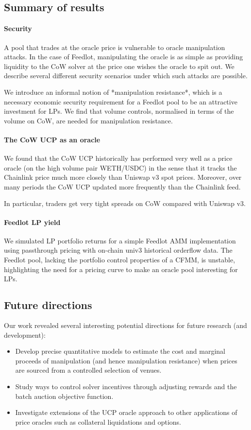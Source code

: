 \documentclass[a4paper,10pt]{article}
\theoremstyle{remark}
\begin{document}
\subsection{Summary of results}

\paragraph{Security}
A pool that trades at the oracle price is vulnerable to oracle manipulation attacks. In the case of Feedlot, manipulating the oracle is as simple as providing liquidity to the CoW solver at the price one wishes the oracle to spit out. We describe several different security scenarios under which such attacks are possible.

We introduce an informal notion of *manipulation resistance*, which is a necessary economic security requirement for a Feedlot pool to be an attractive investment for LPs. We find that volume controls, normalised in terms of the volume on CoW, are needed for manipulation resistance.

\paragraph{The CoW UCP as an oracle}
We found that the CoW UCP historically has performed very well as a price oracle (on the high volume pair WETH/USDC) in the sense that it tracks the Chainlink price much more closely than Uniswap v3 spot prices. Moreover, over many periods the CoW UCP updated more frequently than the Chainlink feed.
  
In particular, traders get very tight spreads on CoW compared with Uniswap v3.
  
\paragraph{Feedlot LP yield}
  
We simulated LP portfolio returns for a simple Feedlot AMM implementation using passthrough pricing with on-chain univ3 historical orderflow data. The Feedlot pool, lacking the portfolio control properties of a CFMM, is unstable, highlighting the need for a pricing curve to make an oracle pool interesting for LPs.

\subsection{Future directions}
Our work revealed several interesting potential directions for future research (and development):
\begin{itemize}
  \item 
    Develop precise quantitative models to estimate the cost and marginal proceeds of manipulation (and hence manipulation resistance) when prices are sourced from a controlled selection of venues.
  \item
    Study ways to control solver incentives through adjusting rewards and the batch auction objective function.
  \item
    Investigate extensions of the UCP oracle approach to other applications of price oracles such as collateral liquidations and options.
\end{itemize}
\end{document}
